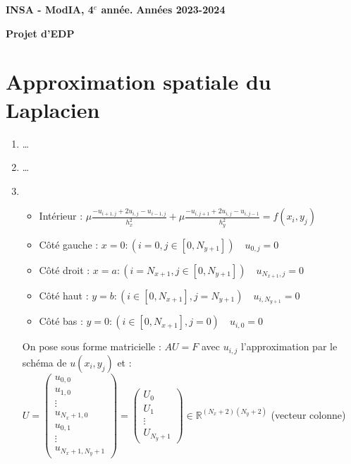 \documentclass[12pt,a4paper]{article}
\newcommand{\entete}{
    \noindent\textbf{INSA - ModIA, 4$^e$ année.}
    \hfill \textbf{Années 2023-2024}
    
    \begin{center}
        \textbf{\LARGE Projet d'EDP}
    \end{center}
}
\begin{document}
\entete

\vspace{0.5cm}


\section*{Approximation spatiale du Laplacien}

\begin{enumerate}
    \item \dots
    \item \dots
    

    \item \begin{itemize}
        \item Intérieur : $\mu \frac{-u_{i+1, j} + 2u_{i,j} - u_{i-1,j}}{h_x^2} + \mu \frac{-u_{i, j+1} + 2u_{i,j} - u_{i,j-1}}{h_y^2} = f(x_i, y_j)$
        \item Côté gauche : $x = 0 :(i = 0, j \in [0, N_{y+1}]) \quad u_{0, j} = 0$
        \item Côté droit : $x = a :(i = N_{x+1}, j \in [0, N_{y+1}]) \quad u_{N_{x+1}, j} = 0$
        \item Côté haut : $y = b :(i \in [0, N_{x+1}], j = N_{y+1}) \quad u_{i, N_{y+1}} = 0$
        \item Côté bas : $y = 0 :(i \in [0, N_{x+1}], j = 0) \quad u_{i, 0} = 0$
    \end{itemize}

    On pose sous forme matricielle : $AU = F$ avec $u_{i,j}$ l'approximation par le schéma de $u(x_i, y_j)$ et :\\

    $U = \begin{pmatrix}
        u_{0,0} \\
        u_{1,0} \\
        \vdots \\
        u_{N_x+1,0} \\
        u_{0,1} \\
        \vdots \\
        u_{N_x+1,N_y+1}
    \end{pmatrix} = \begin{pmatrix}
        U_0 \\
        U_1 \\
        \vdots \\
        U_{N_y+1}
        \end{pmatrix} \in \mathbb{R}^{(N_x+2)(N_y+2)}$ (vecteur colonne)\\


\end{enumerate}
\end{document}
